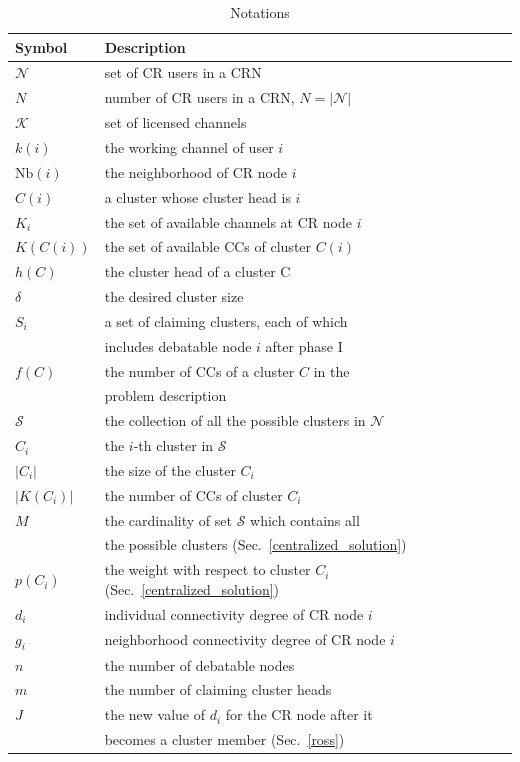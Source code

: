\documentclass[times]{ettauth}
\theoremstyle{mytheoremstyle}
\theoremstyle{mytheoremstyle}
\theoremstyle{mytheoremstyle}
\begin{document}
\begin{table}[h!]
\caption{Notations}
\label{tab1}
\centering
\begin{tabular}{llr}
\toprule
Symbol & Description \\
\midrule
$\mathcal{N}$  & set of CR users in a CRN\\
$N$ & number of CR users in a CRN, $N=|\mathcal{N}|$\\
$\mathcal{K}$	& set of licensed channels\\
$k(i)$ & the working channel of user $i$\\
$\text{Nb}(i)$ & the neighborhood of CR node $i$    \\
$C(i)$ & a cluster whose cluster head is $i$  \\
$K_i$   & the set of available channels at CR node $i$  \\
$K(C(i))$   & the set of available CCs of cluster $C(i)$ \\
$h(C)$ & the cluster head of a cluster C\\
$\delta$ & the desired cluster size\\
$S_i$ & a set of claiming clusters, each of which \\
& includes debatable node $i$ after phase I\\
$f(C)$ & the number of CCs of a cluster $C$ in the\\ 
& problem description\\
 $\mathcal{S}$ & the collection of all the possible clusters in $\mathcal{N}$\\
 $C_i$  & the $i$-th cluster in $\mathcal{S}$ \\
 $|C_i|$ & the size of the cluster $C_i$\\
 $|K(C_i)|$ & the number of CCs of cluster $C_i$\\
 $M$ & the cardinality of set $\mathcal{S}$ which contains all\\ 
 & the possible clusters (Sec.~\ref{centralized_solution})\\
 $p(C_i)$ & the weight with respect to cluster $C_i$ (Sec.~\ref{centralized_solution}) \\
 $d_i$  & individual connectivity degree of CR node $i$\\
$g_i$  & neighborhood connectivity degree of CR node $i$\\
  $n$ & the number of debatable nodes\\
 $m$ & the number of claiming cluster heads\\
 $J$ & the new value of $d_i$ for the CR node after it\\
 & becomes a cluster member (Sec.~\ref{ross})\\
\bottomrule
\end{tabular}
\end{table}
\end{document}
